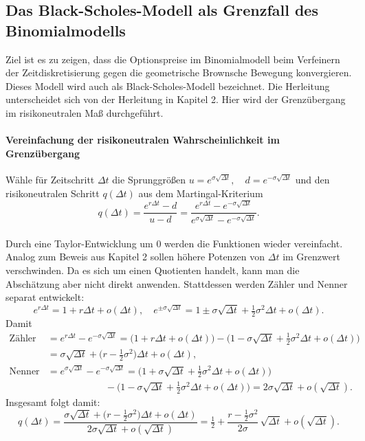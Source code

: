 \subsection{Das Black-Scholes-Modell als Grenzfall des Binomialmodells}
Ziel ist es zu zeigen, dass die Optionspreise im Binomialmodell
beim Verfeinern der Zeitdiskretisierung gegen die geometrische Brownsche Bewegung konvergieren.
Dieses Modell wird auch als Black-Scholes-Modell bezeichnet. Die Herleitung unterscheidet sich
von der Herleitung in Kapitel 2. Hier wird der Grenzübergang im risikoneutralen Maß durchgeführt.

\paragraph{Vereinfachung der risikoneutralen Wahrscheinlichkeit im Grenzübergang}
Wähle für Zeitschritt $\Delta t$ die Sprunggrößen
$
u = e^{\sigma \sqrt{\Delta t}},\quad d = e^{-\sigma \sqrt{\Delta t}}
$
und den risikoneutralen Schritt $q(\Delta t)$ aus dem Martingal-Kriterium
$$
q(\Delta t) = \frac{e^{r \Delta t} - d}{u - d}
= \frac{e^{r \Delta t} - e^{-\sigma \sqrt{\Delta t}}}{e^{\sigma \sqrt{\Delta t}} - e^{-\sigma \sqrt{\Delta t}}}.
$$
\\ Durch eine Taylor-Entwicklung um $0$ werden die Funktionen wieder vereinfacht. Analog zum Beweis aus Kapitel 2
sollen höhere Potenzen von $\Delta t$ im Grenzwert verschwinden. Da es sich um einen Quotienten handelt,
kann man die Abschätzung aber nicht direkt anwenden. Stattdessen werden Zähler und Nenner separat entwickelt:
$$
e^{r\Delta t} = 1 + r\Delta t + o(\Delta t),\quad
e^{\pm \sigma\sqrt{\Delta t}} = 1 \pm \sigma \sqrt{\Delta t} + \tfrac12 \sigma^2 \Delta t + o(\Delta t).
$$
Damit
$$
\begin{aligned}
\text{Zähler} &= e^{r \Delta t} - e^{-\sigma \sqrt{\Delta t}}
= \big(1 + r\Delta t + o(\Delta t)\big) - \big(1 - \sigma \sqrt{\Delta t} + \tfrac12 \sigma^2 \Delta t + o(\Delta t)\big) \\
&= \sigma \sqrt{\Delta t} + \big(r - \tfrac12 \sigma^2\big)\Delta t + o(\Delta t), \\
\text{Nenner} &= e^{\sigma \sqrt{\Delta t}} - e^{-\sigma \sqrt{\Delta t}}
= \big(1 + \sigma \sqrt{\Delta t} + \tfrac12 \sigma^2 \Delta t + o(\Delta t)\big) \\
&\qquad\qquad\qquad - \big(1 - \sigma \sqrt{\Delta t} + \tfrac12 \sigma^2 \Delta t + o(\Delta t)\big)
= 2\sigma \sqrt{\Delta t} + o(\sqrt{\Delta t}).
\end{aligned}
$$
Insgesamt folgt damit:
$$
q(\Delta t) = \frac{\sigma \sqrt{\Delta t} + \big(r - \tfrac12 \sigma^2\big)\Delta t + o(\Delta t)}{2\sigma \sqrt{\Delta t} + o(\sqrt{\Delta t})}
= \tfrac12 + \frac{r - \tfrac12 \sigma^2}{2\sigma}\,\sqrt{\Delta t} + o(\sqrt{\Delta t}).
$$

